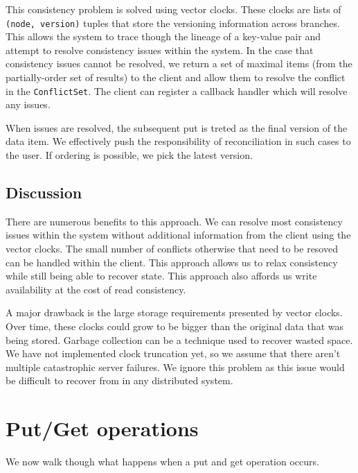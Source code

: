\documentclass[paper=a4,fontsize=11pt]{report} %
\numberwithin{equation}{section} %
\numberwithin{figure}{section} %
\numberwithin{table}{section} %
\begin{document}
This consistency problem is solved using vector clocks. These clocks are lists of \texttt{(node, version)} tuples that store the versioning information across branches. This allows the system to trace though the lineage of a key-value pair and attempt to resolve consistency issues within the system. In the case that consistency issues cannot be resolved, we return a set of maximal items (from the partially-order set of results) to the client and allow them to resolve the conflict in the \texttt{ConflictSet}. The client can register a callback handler which will resolve any issues.

When issues are resolved, the subsequent put is treted as the final version of the data item. We effectively push the responsibility of reconciliation in such cases to the user. If ordering is possible, we pick the latest version. 

\subsection{Discussion}
There are numerous benefits to this approach. We can resolve most consistency issues within the system without additional information from the client using the vector clocks. The small number of conflicts otherwise that need to be resoved can be handled within the client. This approach allows us to relax consistency while still being able to recover state. This approach also affords us write availability at the cost of read consistency.

A major drawback is the large storage requirements presented by vector clocks. Over time, these clocks could grow to be bigger than the original data that was being stored. Garbage collection can be a technique used to recover wasted space. We have not implemented clock truncation yet, so we assume that there aren't multiple catastrophic server failures. We ignore this problem as this issue would be difficult to recover from in any distributed system.


\section{Put/Get operations}
We now walk though what happens when a put and get operation occurs.
\end{document}
